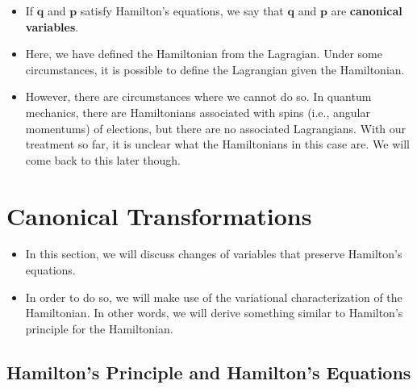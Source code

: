 \documentclass[10pt]{article}
\newcommand{\ve}[1]{\mathbf{#1}}
\begin{document}
\begin{itemize}
    \item If $\ve{q}$ and $\ve{p}$ satisfy Hamilton's equations, we say that $\ve{q}$ and $\ve{p}$ are {\bf canonical variables}.    

    \item Here, we have defined the Hamiltonian from the Lagragian. Under some circumstances, it is possible to define the Lagrangian given the Hamiltonian.

    \item However, there are circumstances where we cannot do so. In quantum mechanics, there are Hamiltonians associated with spins (i.e., angular momentums) of elections, but there are no associated Lagrangians. With our treatment so far, it is unclear what the Hamiltonians in this case are. We will come back to this later though.
  \end{itemize}

  \section{Canonical Transformations}

  \begin{itemize}
    \item In this section, we will discuss changes of variables that preserve Hamilton's equations. 

    \item In order to do so, we will make use of the variational characterization of the Hamiltonian. In other words, we will derive something similar to Hamilton's principle for the Hamiltonian. 
  \end{itemize}

  \subsection{Hamilton's Principle and Hamilton's Equations}
\end{document}
